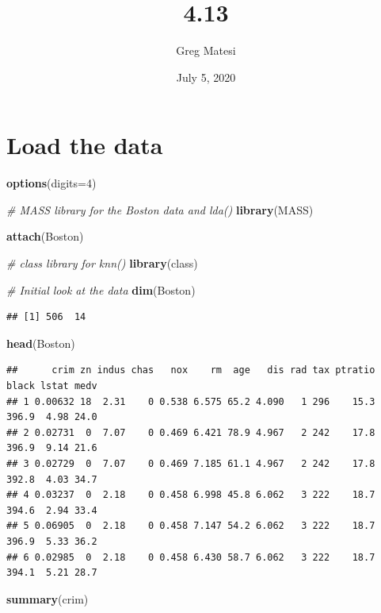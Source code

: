 \documentclass[
]{article}
\title{4.13}
\author{Greg Matesi}
\date{July 5, 2020}
\newenvironment{Shaded}{\begin{snugshade}}{\end{snugshade}}
\newcommand{\CommentTok}[1]{\textcolor[rgb]{0.56,0.35,0.01}{\textit{#1}}}
\newcommand{\DataTypeTok}[1]{\textcolor[rgb]{0.13,0.29,0.53}{#1}}
\newcommand{\DecValTok}[1]{\textcolor[rgb]{0.00,0.00,0.81}{#1}}
\newcommand{\KeywordTok}[1]{\textcolor[rgb]{0.13,0.29,0.53}{\textbf{#1}}}
\newcommand{\NormalTok}[1]{#1}
\begin{document}
\maketitle

\hypertarget{load-the-data}{%
\section{Load the data}\label{load-the-data}}

\begin{Shaded}
\begin{Highlighting}[]
\KeywordTok{options}\NormalTok{(}\DataTypeTok{digits=}\DecValTok{4}\NormalTok{)}

\CommentTok{# MASS library for the Boston data and lda()}
\KeywordTok{library}\NormalTok{(MASS)}

\KeywordTok{attach}\NormalTok{(Boston)}

\CommentTok{# class library for knn()}
\KeywordTok{library}\NormalTok{(class)}

\CommentTok{# Initial look at the data}
\KeywordTok{dim}\NormalTok{(Boston)}
\end{Highlighting}
\end{Shaded}

\begin{verbatim}
## [1] 506  14
\end{verbatim}

\begin{Shaded}
\begin{Highlighting}[]
\KeywordTok{head}\NormalTok{(Boston)}
\end{Highlighting}
\end{Shaded}

\begin{verbatim}
##      crim zn indus chas   nox    rm  age   dis rad tax ptratio black lstat medv
## 1 0.00632 18  2.31    0 0.538 6.575 65.2 4.090   1 296    15.3 396.9  4.98 24.0
## 2 0.02731  0  7.07    0 0.469 6.421 78.9 4.967   2 242    17.8 396.9  9.14 21.6
## 3 0.02729  0  7.07    0 0.469 7.185 61.1 4.967   2 242    17.8 392.8  4.03 34.7
## 4 0.03237  0  2.18    0 0.458 6.998 45.8 6.062   3 222    18.7 394.6  2.94 33.4
## 5 0.06905  0  2.18    0 0.458 7.147 54.2 6.062   3 222    18.7 396.9  5.33 36.2
## 6 0.02985  0  2.18    0 0.458 6.430 58.7 6.062   3 222    18.7 394.1  5.21 28.7
\end{verbatim}

\begin{Shaded}
\begin{Highlighting}[]
\KeywordTok{summary}\NormalTok{(crim)}
\end{Highlighting}
\end{Shaded}
\end{document}
